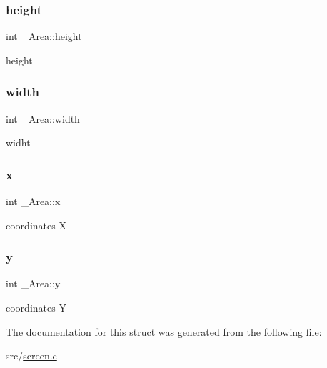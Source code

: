 \subsubsection{\texorpdfstring{height}{height}}
{\footnotesize\ttfamily int \+\_\+\+Area\+::height}

height \mbox{\label{struct__Area_aa2f753fc3d254821603ac4512db814f1}} 
\subsubsection{\texorpdfstring{width}{width}}
{\footnotesize\ttfamily int \+\_\+\+Area\+::width}

widht \mbox{\label{struct__Area_a093b8c2929094bac88bbf5ee7db85573}} 
\subsubsection{\texorpdfstring{x}{x}}
{\footnotesize\ttfamily int \+\_\+\+Area\+::x}

coordinates X \mbox{\label{struct__Area_a867e601f05480db03237c3a17d4c77f8}} 
\subsubsection{\texorpdfstring{y}{y}}
{\footnotesize\ttfamily int \+\_\+\+Area\+::y}

coordinates Y 

The documentation for this struct was generated from the following file\+:\begin{DoxyCompactItemize}
\item 
src/\hyperlink{screen_8c}{screen.\+c}\end{DoxyCompactItemize}
